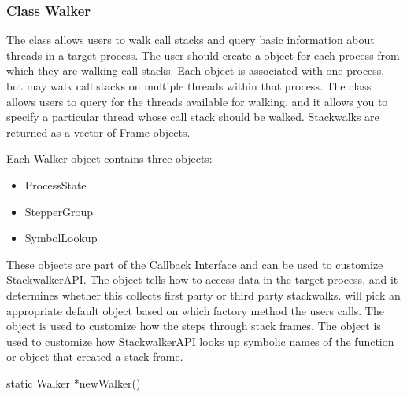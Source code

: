 \subsubsection{Class Walker}
\label{subsec:walker}

The  class allows users to walk call stacks and query basic information
about threads in a target process. The user should create a  object for
each process from which they are walking call stacks. Each  object is
associated with one process, but may walk call stacks on multiple threads within
that process. The  class allows users to query for the threads available
for walking, and it allows you to specify a particular thread whose call stack
should be walked. Stackwalks are returned as a vector of Frame objects. 

Each Walker object contains three objects: 
\begin{itemize}
    \item ProcessState
    \item StepperGroup
    \item SymbolLookup
\end{itemize}

These objects are part of the Callback Interface and can be used to customize
StackwalkerAPI. The  object tells  how to access data in the
target process, and it determines whether this  collects first party or
third party stackwalks.  will pick an appropriate default 
object based on which factory method the users calls. The  object is
used to customize how the  steps through stack frames. The
object is used to customize how StackwalkerAPI looks up symbolic names of the
function or object that created a stack frame.

\begin{apient}
static Walker *newWalker()
\end{apient}
 
